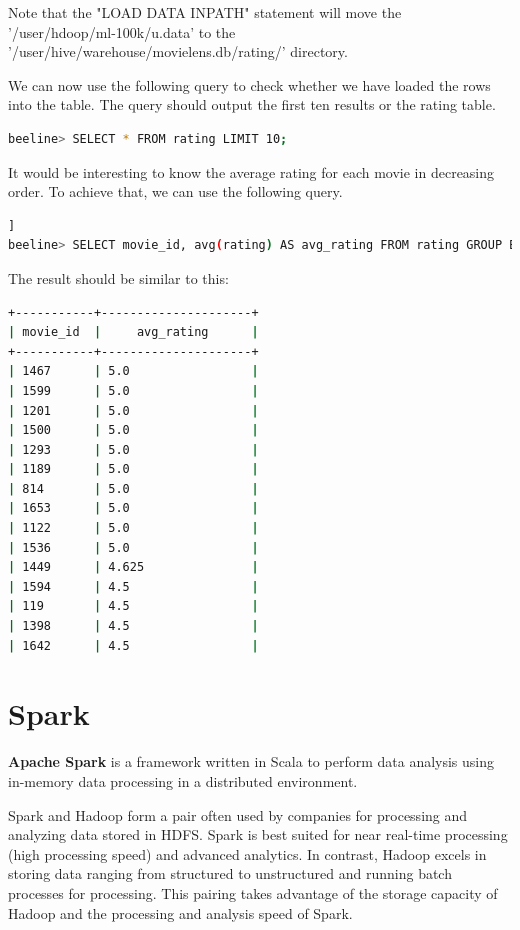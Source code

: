 \documentclass[12pt,english]{book}
\begin{document}
Note that the "LOAD DATA INPATH" statement will move the '/user/hdoop/ml-100k/u.data' to the '/user/hive/warehouse/movielens.db/rating/' directory.

We can now use the following query to check whether we have loaded the rows into the table.
The query should output the first ten results or the rating table.

\begin{lstlisting}[language=bash, frame=single, basicstyle=\footnotesize]
beeline> SELECT * FROM rating LIMIT 10;
\end{lstlisting}

It would be interesting to know the average rating for each movie in decreasing order.
To achieve that, we can use the following query.

\begin{lstlisting}[language=bash, frame=single, basicstyle=\footnotesize, breaklines=true, postbreak=\mbox{\textcolor{red}{$\hookrightarrow$}\space}]]
beeline> SELECT movie_id, avg(rating) AS avg_rating FROM rating GROUP BY movie_id ORDER BY avg_rating DESC;
\end{lstlisting}

The result should be similar to this:

\begin{lstlisting}[language=bash, frame=single, basicstyle=\footnotesize]
+-----------+---------------------+
| movie_id  |     avg_rating      |
+-----------+---------------------+
| 1467      | 5.0                 |
| 1599      | 5.0                 |
| 1201      | 5.0                 |
| 1500      | 5.0                 |
| 1293      | 5.0                 |
| 1189      | 5.0                 |
| 814       | 5.0                 |
| 1653      | 5.0                 |
| 1122      | 5.0                 |
| 1536      | 5.0                 |
| 1449      | 4.625               |
| 1594      | 4.5                 |
| 119       | 4.5                 |
| 1398      | 4.5                 |
| 1642      | 4.5                 |
\end{lstlisting}

\section{Spark}

\textbf{Apache Spark} is a framework written in Scala to perform data analysis using in-memory data processing in a distributed environment.

Spark and Hadoop form a pair often used by companies for processing and analyzing data stored in HDFS.
Spark is best suited for near real-time processing (high processing speed) and advanced analytics.
In contrast, Hadoop excels in storing data ranging from structured to unstructured and running batch processes for processing.
This pairing takes advantage of the storage capacity of Hadoop and the processing and analysis speed of Spark.
\end{document}
